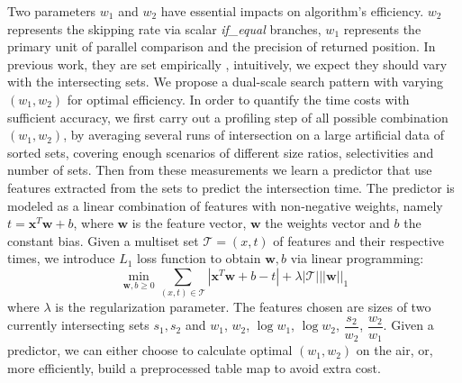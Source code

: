 Two parameters $ w_1 $ and $ w_2 $ have essential impacts on algorithm's efficiency.
$ w_2 $ represents the skipping rate via scalar \textit{if\_equal} branches, $ w_1 $ represents the primary unit of parallel comparison and the precision of returned position.
In previous work, they are set empirically \cite{inoue2014faster,lemire2016simd}, intuitively, we expect they should vary with the intersecting sets.
We propose a dual-scale search pattern with varying $ (w_1,w_2) $ for optimal efficiency.
In order to quantify the time costs with sufficient accuracy, we first carry out a profiling step of all possible combination $ (w_1,w_2) $, by averaging several runs of intersection on a large artificial data of sorted sets, covering enough scenarios of different size ratios, selectivities and number of sets.
Then from these measurements we learn a predictor that use features extracted from the sets to predict the intersection time.
The predictor is modeled as a linear combination of features with non-negative weights, namely $ t=\textbf{x}^T\textbf{w}+b $, where $ \textbf{w} $ is the feature vector, $ \textbf{w} $ the weights vector and $ b $ the constant bias.
Given a multiset set $ \mathcal{T} = {(x,t)} $ of features and their respective times, we introduce $ L_1 $ loss function to obtain $ \textbf{w}, b $ via linear programming:
\begin{displaymath}
\min_{\textbf{w},b\geq 0} \sum_{(x,t)\in \mathcal{T}}|\textbf{x}^T\textbf{w}+b-t|+\lambda|\mathcal{T}|||\textbf{w}||_1
\end{displaymath}
\noindent where $ \lambda $ is the regularization parameter.
The features chosen are sizes of two currently intersecting sets $ s_1, s_2 $ and $ w_1$, $w_2 $, $\log w_1$, $\log w_2$, $\dfrac{s_2}{w_2}$, $\dfrac{w_2}{w_1} $.
Given a predictor, we can either choose to calculate optimal $ (w_1,w_2) $ on the air, or, more efficiently, build a preprocessed table map to avoid extra cost.

